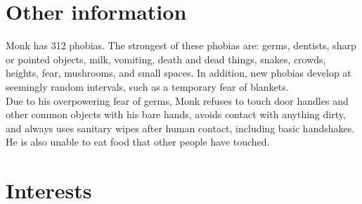 \documentclass[]{mcec-cv-01}
\begin{document}
\section{Other information}
\nopagebreak
Monk has 312 phobias. The strongest of these phobias are: germs, dentists, sharp or pointed objects, milk, vomiting, death and dead things, snakes, crowds, heights, fear, mushrooms, and small spaces. In addition, new phobias develop at seemingly random intervals, such as a temporary fear of blankets.\\
Due to his overpowering fear of germs, Monk refuses to touch door handles and other common objects with his bare hands, avoids contact with anything dirty, and always uses sanitary wipes after human contact, including basic handshakes. He is also unable to eat food that other people have touched.

\section{Interests}
\nopagebreak
{}
\end{document}
